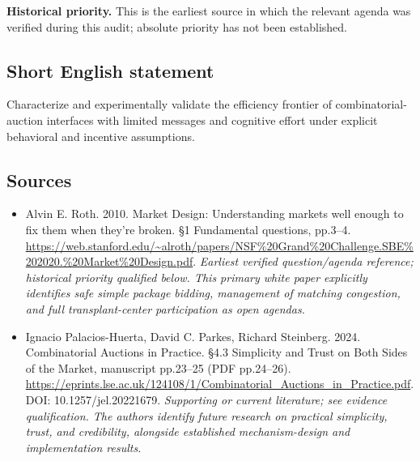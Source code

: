 \documentclass[11pt]{article}
\begin{document}
\par\textbf{Historical priority.} This is the earliest source in which the relevant agenda was verified during this audit; absolute priority has not been established.

\subsection{Short English statement}
Characterize and experimentally validate the efficiency frontier of combinatorial-auction interfaces with limited messages and cognitive effort under explicit behavioral and incentive assumptions.

\subsection{Sources}
\begin{itemize}\raggedright
\item[\textnormal{[S1]}]\hypertarget{source:30007576:1}{} Alvin E. Roth. 2010. Market Design: Understanding markets well enough to fix them when they’re broken. §1 Fundamental questions, pp.3–4.
\url{https://web.stanford.edu/~alroth/papers/NSF%20Grand%20Challenge.SBE%202020.%20Market%20Design.pdf}.
{\small\textit{Earliest verified question/agenda reference; historical priority qualified below. This primary white paper explicitly identifies safe simple package bidding, management of matching congestion, and full transplant-center participation as open agendas.}}

\item[\textnormal{[S2]}]\hypertarget{source:30007576:2}{} Ignacio Palacios-Huerta, David C. Parkes, Richard Steinberg. 2024. Combinatorial Auctions in Practice. §4.3 Simplicity and Trust on Both Sides of the Market, manuscript pp.23–25 (PDF pp.24–26).
\url{https://eprints.lse.ac.uk/124108/1/Combinatorial_Auctions_in_Practice.pdf}.
DOI: 10.1257/jel.20221679.
{\small\textit{Supporting or current literature; see evidence qualification. The authors identify future research on practical simplicity, trust, and credibility, alongside established mechanism-design and implementation results.}}
\end{itemize}
\end{document}
